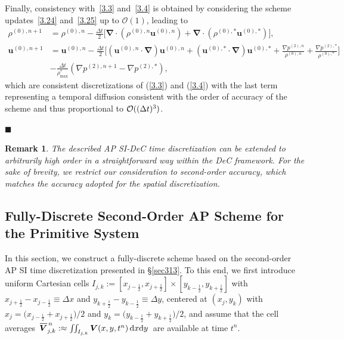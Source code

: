 \documentclass[A4paper,12pt,twoside]{article}
\newtheorem{remark}{Remark}[section]
\newenvironment{proof}{{\flushleft \bf Proof:}}{}
\numberwithin{equation}{section}
\numberwithin{figure}{section}
\numberwithin{table}{section}
\def\bnabla{\bm{\nabla}}
\newcommand{\dt}{\Delta t}
\newcommand{\dx}{\Delta x}
\newcommand{\dy}{\Delta y}
\newcommand{\kph}{{k+\frac{1}{2}}}
\newcommand{\kmh}{{k-\frac{1}{2}}}
\newcommand{\jph}{{j+\frac{1}{2}}}
\newcommand{\jmh}{{j-\frac{1}{2}}}
\newcommand{\ve}{\varepsilon}
\newcommand\eref[1]{(\ref{#1})}
\newcommand*\xbar[1]{%
  \hbox{%
    \vbox{%
      \hrule height 0.5pt %
      \kern0.4ex%
      \hbox{%
        \kern-0.05em%
        \ensuremath{#1}%
        \kern-0.00em%
      }%
    }%
  }%
}
\newcommand{\lore}[1]{{\leavevmode\color{red} #1}}
\begin{document}
\begin{proof}
Finally, consistency with~\eqref{3.3} and~\eqref{3.4} is obtained by considering the scheme updates~\eqref{3.24} and~\eqref{3.25} up to $\mathcal{O}(1)$, leading to
\begin{equation}
\begin{aligned}
\rho^{(0),n+1}&=\rho^{(0),n}-\frac{\dt}{2}\big[\bnabla\!\cdot\!(\rho^{(0),n}\bm u^{(0),n})+\bnabla\!\cdot\!(\rho^{(0),*}\bm u^{(0),*})\big],\\
\bm u^{(0),n+1}&=\bm u^{(0),n}-\frac{\dt}{2}\bigg[(\bm u^{(0),n}\!\cdot\!\bnabla)\bm u^{(0),n}+(\bm u^{(0),*}\!\cdot\!\bnabla)\bm u^{(0),*}+
\frac{\nabla p^{(2),n}}{\rho^{(0),n}}+\frac{\nabla p^{(2),*}}{\rho^{(0),*}}\bigg]\\
&-\frac{\dt}{\rho_{\max}^*}\left(\nabla p^{(2),n+1}-\nabla p^{(2),*}\right),
\end{aligned}
\label{4.16f}
\end{equation}
which are consistent discretizations of  \eref{3.3} and \eref{3.4} with the last term representing a temporal diffusion consistent with the order of accuracy of the scheme and thus proportional to ${\cal O}((\dt)^3)$.


\hfill$\blacksquare$
\end{proof}
\begin{remark}
The described AP SI-DeC time \lore{discretization} can be
extended to arbitrarily high order \lore{in a straightforward way} within the DeC framework. For the
sake of brevity, we restrict our consideration \lore{to second-order accuracy, which matches the accuracy adopted for the spatial discretization.}
\end{remark}

\subsection{\lore{Fully-Discrete} Second-Order AP Scheme for the Primitive System}\label{sec32}
In this section, we construct a \lore{fully-discrete} scheme based on the second-order AP SI time discretization presented in \S\ref{sec313}. To
this end, we first introduce uniform Cartesian cells $I_{j,k}:=[x_\jmh,x_\jph]\times[y_\kmh,y_\kph]$ with $x_\jph-x_\jmh\equiv\dx$ and
$y_\kph-y_\kmh\equiv\dy$, centered at $(x_j,y_k)$ with $x_j=\big(x_\jmh+x_\jph\big)/2$ and $y_k=\big(y_\kmh+y_\kph\big)/2$, and assume that
the cell averages $\,\xbar{\bm V}_{j,k}^{\,n}:\approx\iint_{I_{j,k}}\bm V(x,y,t^n)\,{\rm d}x{\rm d}y\,$ are available at time $t^n$.
\end{document}
